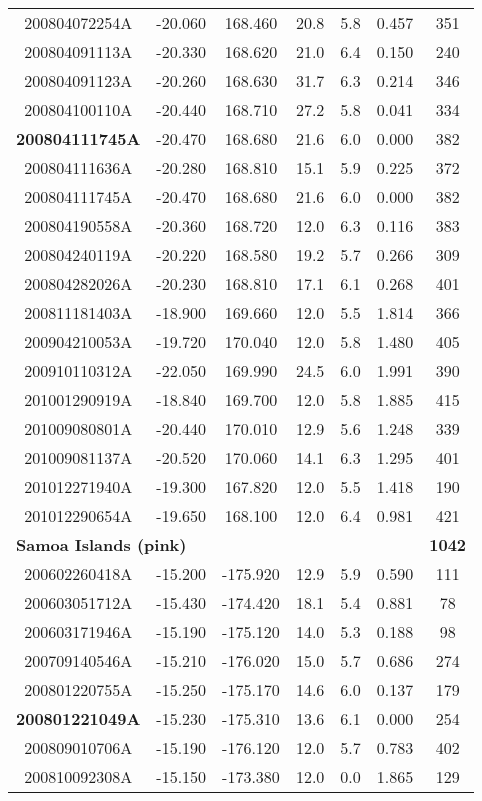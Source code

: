 \documentclass[12pt,oneside]{book}
\begin{document}
\begin{longtable}{ c c c c c c c }
200804072254A &-20.060 &168.460 &20.8 &5.8 &0.457 &351 \\
200804091113A &-20.330 &168.620 &21.0 &6.4 &0.150 &240 \\
200804091123A &-20.260 &168.630 &31.7 &6.3 &0.214 &346 \\
200804100110A &-20.440 &168.710 &27.2 &5.8 &0.041 &334 \\
\textbf{200804111745A} &-20.470 &168.680 &21.6 &6.0 &0.000 &382 \\
200804111636A &-20.280 &168.810 &15.1 &5.9 &0.225 &372 \\
200804111745A &-20.470 &168.680 &21.6 &6.0 &0.000 &382 \\
200804190558A &-20.360 &168.720 &12.0 &6.3 &0.116 &383 \\
200804240119A &-20.220 &168.580 &19.2 &5.7 &0.266 &309 \\
200804282026A &-20.230 &168.810 &17.1 &6.1 &0.268 &401 \\
200811181403A &-18.900 &169.660 &12.0 &5.5 &1.814 &366 \\
200904210053A &-19.720 &170.040 &12.0 &5.8 &1.480 &405 \\
200910110312A &-22.050 &169.990 &24.5 &6.0 &1.991 &390 \\
201001290919A &-18.840 &169.700 &12.0 &5.8 &1.885 &415 \\
201009080801A &-20.440 &170.010 &12.9 &5.6 &1.248 &339 \\
201009081137A &-20.520 &170.060 &14.1 &6.3 &1.295 &401 \\
201012271940A &-19.300 &167.820 &12.0 &5.5 &1.418 &190 \\
201012290654A &-19.650 &168.100 &12.0 &6.4 &0.981 &421 \\ \hline 
\multicolumn{3}{l}{\textbf{Samoa Islands (pink)}} & & & &\textbf{1042} \\
200602260418A &-15.200 &-175.920 &12.9 &5.9 &0.590 &111 \\
200603051712A &-15.430 &-174.420 &18.1 &5.4 &0.881 &78 \\
200603171946A &-15.190 &-175.120 &14.0 &5.3 &0.188 &98 \\
200709140546A &-15.210 &-176.020 &15.0 &5.7 &0.686 &274 \\
200801220755A &-15.250 &-175.170 &14.6 &6.0 &0.137 &179 \\
\textbf{200801221049A} &-15.230 &-175.310 &13.6 &6.1 &0.000 &254 \\
200809010706A &-15.190 &-176.120 &12.0 &5.7 &0.783 &402 \\
200810092308A &-15.150 &-173.380 &12.0 &0.0 &1.865 &129 \\

\end{longtable}
\end{document}
